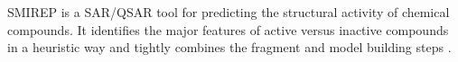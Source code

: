 SMIREP is a SAR/QSAR tool for predicting the structural activity of chemical compounds. It identifies the major features of active versus inactive compounds in a heuristic way and tightly combines the fragment and model building steps \cite{Karwath_2006}. 